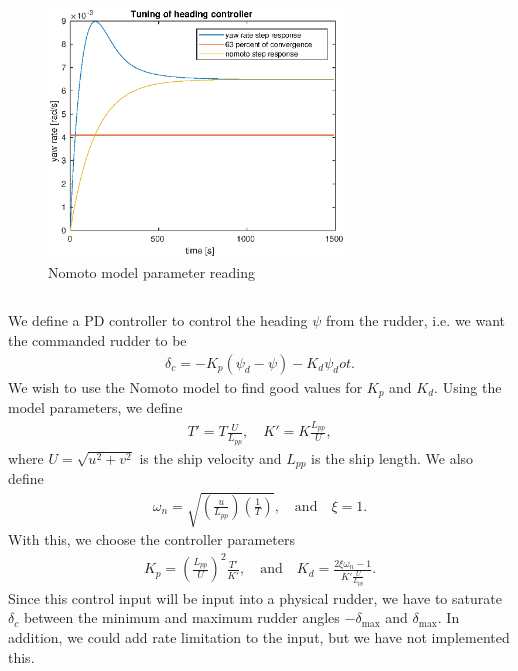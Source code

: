 \begin{figure}[H]
\centering
\includegraphics[width=0.7\textwidth]{nomoto-reading-improved}
\caption{Nomoto model parameter reading}
\label{fig:nomoto_reading}
\end{figure}


\subsection{}
We define a PD controller to control the heading $\psi$ from the rudder, i.e. we want the commanded rudder to be
\begin{equation}\begin{aligned}
\delta_c = -K_p (\psi_d - \psi) - K_d \psi_dot.
\end{aligned}\end{equation}
We wish to use the Nomoto model to find good values for $K_p$ and $K_d$. Using the model parameters, we define
\begin{equation}\begin{aligned}
T' = T \frac{U}{L_{pp}}, \quad K' = K \frac{L_{pp}}{U},
\end{aligned}\end{equation}
where $U = \sqrt{u^2 + v^2}$ is the ship velocity and $L_{pp}$ is the ship length. We also define
\begin{equation}\begin{aligned}
\omega_n = \sqrt{(\frac{u}{L_{pp}}) (\frac{1}{T})}, \quad \text{and} \quad \xi = 1.
\end{aligned}\end{equation}
With this, we choose the controller parameters
\begin{equation}\begin{aligned}
K_p = (\frac{L_{pp}}{U})^2 \frac{T'}{K'}, \quad \text{and} \quad
K_d = \frac{2 \xi \omega_n - 1}{K' \frac{U}{L_{pp}}}.
\end{aligned}\end{equation}
Since this control input will be input into a physical rudder, we have to saturate $\delta_c$ between the minimum and maximum rudder angles $-\delta_{\text{max}}$ and $\delta_{\text{max}}$. In addition, we could add rate limitation to the input, but we have not implemented this.

